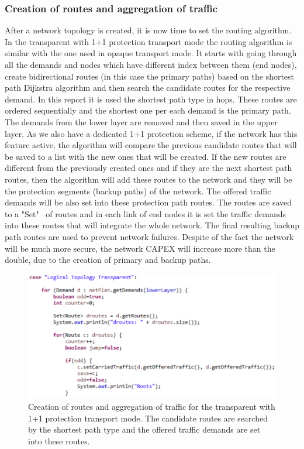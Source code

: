 \subsubsection{Creation of routes and aggregation of traffic}

\vspace{11pt}
After a network topology is created, it is now time to set the routing algorithm. In the transparent with 1+1 protection transport mode the routing algorithm is similar with the one used in opaque transport mode. It starts with going through all the demands and nodes which have different index between them (end nodes), create bidirectional routes (in this case the primary paths) based on the shortest path Dijkstra algorithm and then search the candidate routes for the respective demand. In this report it is used the shortest path type in hops. These routes are ordered sequentially and the shortest one per each demand is the primary path. The demands from the lower layer are removed and then saved in the upper layer.
As we also have a dedicated 1+1 protection scheme, if the network has this feature active, the algorithm will compare the previous candidate routes that will be saved to a list with the new ones that will be created. If the new routes are different from the previously created ones and if they are the next shortest path routes, then the algorithm will add these routes to the network and they will be the protection segments (backup paths) of the network. The offered traffic demands will be also set into these protection path routes. The routes are saved to a "Set" \ of routes and in each link of end nodes it is set the traffic demands into these routes that will integrate the whole network. The final resulting backup path routes are used to prevent network failures. Despite of the fact the network will be much more secure, the network CAPEX will increase more than the double, due to the creation of primary and backup paths.

\begin{figure}[H]
\centering
\includegraphics[width=14cm]{sdf/heuristic/transparent_protection/figures/grooming_transparent_protec1}
\caption{Creation of routes and aggregation of traffic for the transparent with 1+1 protection transport mode. The candidate routes are searched by the shortest path type and the offered traffic demands are set into these routes.}
\label{grooming_transparent_protec1}
\end{figure}

